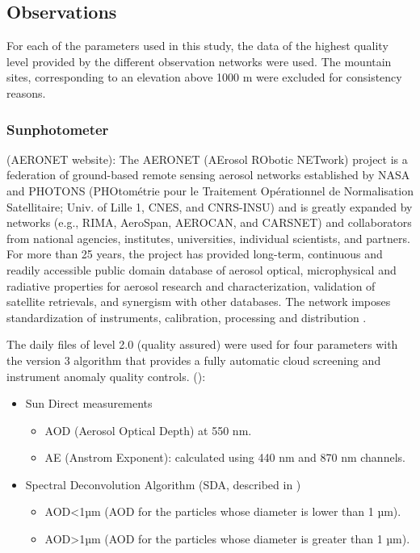 \documentclass[journal abbreviation, manuscript]{copernicus}
\begin{document}
\subsection{Observations}

For each of the parameters used in this study, the data of the highest quality level provided by the different observation networks were used. The mountain sites, corresponding to an elevation above 1000 m were excluded for consistency reasons.

\subsubsection{Sunphotometer}
(AERONET website): The AERONET (AErosol RObotic NETwork) project is a federation of ground-based remote sensing aerosol networks established by NASA and PHOTONS (PHOtométrie pour le Traitement Opérationnel de Normalisation Satellitaire; Univ. of Lille 1, CNES, and CNRS-INSU) and is greatly expanded by networks (e.g., RIMA, AeroSpan, AEROCAN, and CARSNET) and collaborators from national agencies, institutes, universities, individual scientists, and partners. For more than 25 years, the project has provided long-term, continuous and readily accessible public domain database of aerosol optical, microphysical and radiative properties for aerosol research and characterization, validation of satellite retrievals, and synergism with other databases. The network imposes standardization of instruments, calibration, processing and distribution \cite{holben2001emerging}.

The daily files of level 2.0 (quality assured) were used for four parameters with the version 3 algorithm that provides a fully automatic cloud screening and instrument anomaly quality controls. (\cite{smirnov2000cloud,smirnov2004aeronet,giles2019advancements}):

\begin{itemize}
 \item Sun Direct measurements
       \begin{itemize}
        \item AOD (Aerosol Optical Depth) at 550 nm.
        \item AE (Anstrom Exponent): calculated using 440 nm and 870 nm channels.
       \end{itemize}
 \item Spectral Deconvolution Algorithm (SDA, described in \cite{o2003spectral})
       \begin{itemize}
        \item AOD<1µm (AOD for the particles whose diameter is lower than 1 µm).
        \item AOD>1µm (AOD for the particles whose diameter is greater than 1 µm).
       \end{itemize}
\end{itemize}
\end{document}
